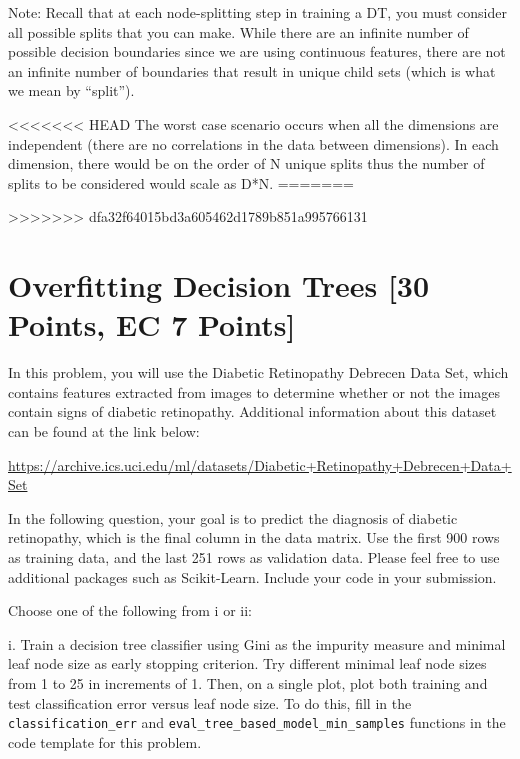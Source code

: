 Note: Recall that at each node-splitting step in training a DT, you must consider all possible splits that you can make. While there are an infinite number of possible decision boundaries since we are using continuous features, there are not an infinite number of boundaries that result in unique child sets (which is what we mean by ``split'').

\begin{solution}
<<<<<<< HEAD
   The worst case scenario occurs when all the dimensions are independent (there are no correlations in the data between dimensions). In each dimension, there would be on the order of N unique splits thus the number of splits to be considered would scale as D*N.
=======
   
>>>>>>> dfa32f64015bd3a605462d1789b851a995766131
\end{solution}


\newpage


\section{Overfitting Decision Trees [30 Points, EC 7 Points]}

In this problem, you will use the Diabetic Retinopathy Debrecen Data Set, which contains features extracted from images to determine whether or not the images contain signs of diabetic retinopathy. Additional information about this dataset can be found at the link below:

\url{https://archive.ics.uci.edu/ml/datasets/Diabetic+Retinopathy+Debrecen+Data+Set}

In the following question, your goal is to predict the diagnosis of diabetic retinopathy, which is the final column in the data matrix.  Use the first 900 rows as training data, and the last
251 rows as validation data. Please feel free to use additional packages such as Scikit-Learn. Include your code in your submission.


\indent\problem[10] \smallskip 
Choose one of the following from i or ii: 

\noindent i. Train a decision tree classifier using Gini as the impurity measure and minimal leaf node size as early stopping criterion. Try different minimal leaf node sizes from 1 to 25 in increments of 1. Then, on a single plot, plot both training and test classification error versus leaf node size. To do this, fill in the \texttt{classification_err} and \texttt{eval_tree_based_model_min_samples} functions in the code template for this problem.


